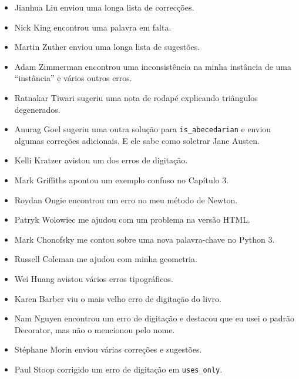\documentclass[10pt]{book}
\begin{document}
\begin {itemize}
\item Jianhua Liu enviou uma longa lista de correcções.

\item Nick King encontrou uma palavra em falta.

\item Martin Zuther enviou uma longa lista de sugestões.

\item Adam Zimmerman encontrou uma inconsistência na minha instância
de uma ``instância'' e vários outros erros.

\item Ratnakar Tiwari sugeriu uma nota de rodapé explicando triângulos
degenerados. %

\item Anurag Goel sugeriu uma outra solução para \verb"is_abecedarian"
e enviou algumas correções adicionais. E ele sabe como
soletrar Jane Austen.

\item Kelli Kratzer avistou um dos erros de digitação.

\item Mark Griffiths apontou um exemplo confuso no Capítulo 3.

\item Roydan Ongie encontrou um erro no meu método de Newton.

\item Patryk Wolowiec me ajudou com um problema na versão HTML.

\item Mark Chonofsky me contou sobre uma nova palavra-chave no Python 3.

\item Russell Coleman me ajudou com minha geometria.

\item Wei Huang avistou vários erros tipográficos.

\item Karen Barber viu o mais velho erro de digitação do livro.

\item Nam Nguyen encontrou um erro de digitação e destacou que eu usei o padrão
Decorator, mas não o mencionou pelo nome.

\item St\'{e}phane Morin enviou várias correções e sugestões.

\item Paul Stoop corrigido um erro de digitação em \verb+uses_only+.


\end{itemize}
\end{document}
